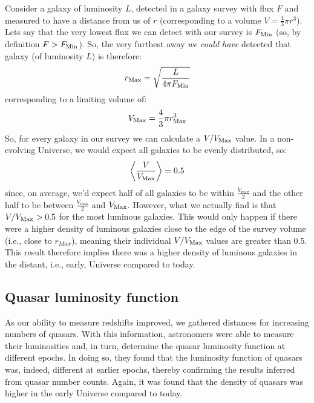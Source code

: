 \documentclass[11pt]{article}
\begin{document}
Consider a galaxy of luminosity $L$, detected in a galaxy survey with
flux $F$ and measured to have a distance from us of $r$ (corresponding
to a volume $V=\frac{4}{3}\pi r^3$). Lets say that the very lowest flux
we can detect with our survey is $F_{\rm Min}$ (so, by definition
$F>F_{\rm Min}$). So, the very furthest away {\it we could have}
detected that galaxy (of luminosity $L$) is therefore:
\begin{equation}
r_{\rm Max} = \sqrt{\frac{L}{4\pi F_{\rm Min}}}
\end{equation} 
corresponding to a limiting volume of:
\begin{equation}
V_{\rm Max} = \frac{4}{3}\pi r_{\rm Max}^3
\end{equation} 
So, for every galaxy in our survey we can calculate a $V/V_{\rm Max}$
value. In a non-evolving Universe, we would expect all galaxies to be
evenly distributed, so:
\begin{equation}
\left\langle\frac{V}{V_{\rm Max}}\right\rangle = 0.5
\end{equation}
since, on average, we'd expect half of all galaxies to be within
$\frac{V_{\max}}{2}$ and the other half to be between
$\frac{V_{\max}}{2}$ and $V_{\rm Max}$. However, what we actually find
is that $V/V_{\rm Max}>0.5$ for the most luminous galaxies. This would
only happen if there were a higher density of luminous galaxies close
to the edge of the survey volume (i.e., close to $r_{Max}$), meaning
their individual $V/V_{\rm Max}$ values are greater than 0.5. This
result therefore implies there was a higher density of luminous galaxies in
the distant, i.e., early, Universe compared to today.

\subsection{Quasar luminosity function}
As our ability to measure redshifts improved, we gathered distances
for increasing numbers of quasars. With this information, astronomers
were able to measure their luminosities and, in turn, determine the
quasar luminosity function at different epochs. In doing so, they
found that the luminosity function of quasars was, indeed, different
at earlier epochs, thereby confirming the results inferred from quasar
number counts. Again, it was found that the density of quasars was
higher in the early Universe compared to today.
\end{document}
